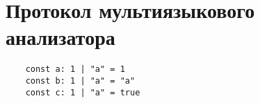 \chapter{Протокол мультиязыкового анализатора}
\label{cha:appendix1}

\begin{verbatim}
    const a: 1 | "a" = 1
    const b: 1 | "a" = "a"
    const c: 1 | "a" = true
\end{verbatim}

